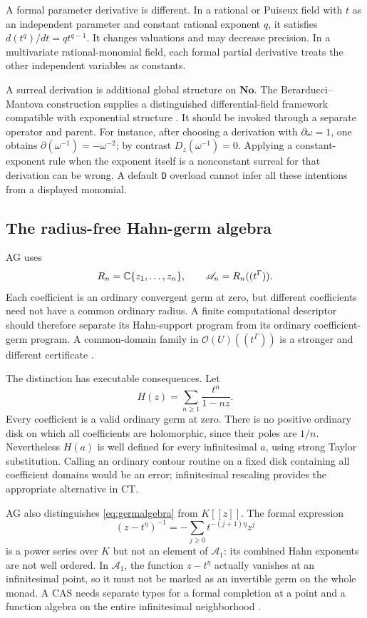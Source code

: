 \documentclass[11pt,letterpaper]{article}
\theoremstyle{definition}\newtheorem{definition}[theorem]{Definition}
\theoremstyle{remark}\newtheorem{remark}[theorem]{Remark}
\newcommand{\No}{\mathbf{No}}\newcommand{\SC}{\mathbf{SC}}
\newcommand{\Acal}{\mathscr A}\newcommand{\HH}{\mathcal H}\newcommand{\OO}{\mathcal O}
\newcommand{\code}[1]{\texttt{#1}}
\numberwithin{equation}{section}\setcounter{tocdepth}{2}
\begin{document}
A formal parameter derivative is different. In a rational or Puiseux field with $t$ as an independent parameter and constant rational exponent $q$, it satisfies $d(t^q)/dt=qt^{q-1}$. It changes valuations and may decrease precision. In a multivariate rational-monomial field, each formal partial derivative treats the other independent variables as constants.

A surreal derivation is additional global structure on $\No$. The Berarducci--Mantova construction supplies a distinguished differential-field framework compatible with exponential structure \cite{BMder}. It should be invoked through a separate operator and parent. For instance, after choosing a derivation with $\partial\omega=1$, one obtains $\partial(\omega^{-1})=-\omega^{-2}$; by contrast $D_z(\omega^{-1})=0$. Applying a constant-exponent rule when the exponent itself is a nonconstant surreal for that derivation can be wrong. A default \code{D} overload cannot infer all these intentions from a displayed monomial.

\subsection{The radius-free Hahn-germ algebra}
AG uses
\begin{equation}\label{eq:germalgebra}
 R_n=\C\{z_1,\ldots,z_n\},\qquad
 \Acal_n=R_n((t^\Gamma)).
\end{equation}
Each coefficient is an ordinary convergent germ at zero, but different coefficients need not have a common ordinary radius. A finite computational descriptor should therefore separate its Hahn-support program from its ordinary coefficient-germ program. A common-domain family in $\OO(U)((t^\Gamma))$ is a stronger and different certificate \cite{AG}.

The distinction has executable consequences. Let
\begin{equation}\label{eq:radiusfree}
 H(z)=\sum_{n\ge1}\frac{t^n}{1-nz}.
\end{equation}
Every coefficient is a valid ordinary germ at zero. There is no positive ordinary disk on which all coefficients are holomorphic, since their poles are $1/n$. Nevertheless $H(a)$ is well defined for every infinitesimal $a$, using strong Taylor substitution. Calling an ordinary contour routine on a fixed disk containing all coefficient domains would be an error; infinitesimal rescaling provides the appropriate alternative in CT.

AG also distinguishes \eqref{eq:germalgebra} from $K[[z]]$. The formal expression
\[
 (z-t^\eta)^{-1}=-\sum_{j\ge0}t^{-(j+1)\eta}z^j
\]
is a power series over $K$ but not an element of $\Acal_1$: its combined Hahn exponents are not well ordered. In $\Acal_1$, the function $z-t^\eta$ actually vanishes at an infinitesimal point, so it must not be marked as an invertible germ on the whole monad. A CAS needs separate types for a formal completion at a point and a function algebra on the entire infinitesimal neighborhood \cite{AG}.
\end{document}
